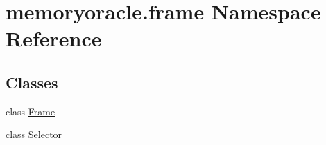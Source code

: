 \hypertarget{namespacememoryoracle_1_1frame}{}\section{memoryoracle.\+frame Namespace Reference}
\label{namespacememoryoracle_1_1frame}
\subsection*{Classes}
\begin{DoxyCompactItemize}
\item 
class \hyperlink{classmemoryoracle_1_1frame_1_1Frame}{Frame}
\item 
class \hyperlink{classmemoryoracle_1_1frame_1_1Selector}{Selector}
\end{DoxyCompactItemize}
